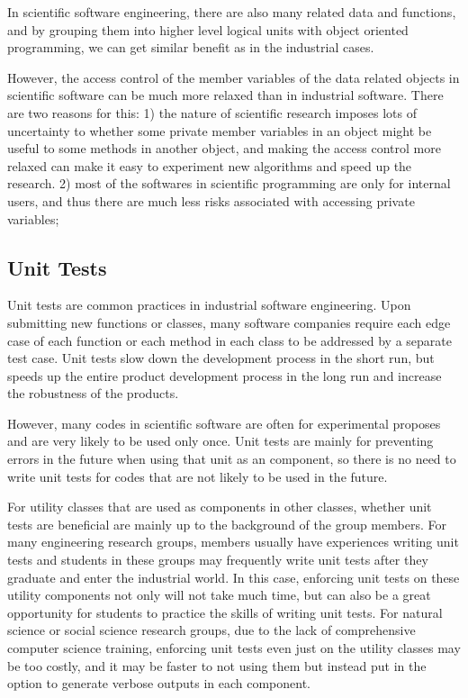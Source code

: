 In scientific software engineering, there are also many related data and functions, and by grouping them into higher level logical units with object oriented programming, we can get similar benefit as in the industrial cases.

However, the access control of the member variables of the data related objects in scientific software can be much more relaxed than in industrial software.
There are two reasons for this:
1) the nature of scientific research imposes lots of uncertainty to whether some private member variables in an object might be useful to some methods in another object, and making the access control more relaxed can make it easy to experiment new algorithms and speed up the research.
2) most of the softwares in scientific programming are only for internal users, and thus there are much less risks associated with accessing private variables;

\subsection{Unit Tests}
Unit tests are common practices in industrial software engineering.
Upon submitting new functions or classes, many software companies require each edge case of each function or each method in each class to be addressed by a separate test case.
Unit tests slow down the development process in the short run, but speeds up the entire product development process in the long run and increase the robustness of the products.

However, many codes in scientific software are often for experimental proposes and are very likely to be used only once.
Unit tests are mainly for preventing errors in the future when using that unit as an component, so there is no need to write unit tests for codes that are not likely to be used in the future.

For utility classes that are used as components in other classes, whether unit tests are beneficial are mainly up to the background of the group members.
For many engineering research groups, members usually have experiences writing unit tests and students in these groups may frequently write unit tests after they graduate and enter the industrial world.
In this case, enforcing unit tests on these utility components not only will not take much time, but can also be a great opportunity for students to practice the skills of writing unit tests.
For natural science or social science research groups, due to the lack of comprehensive computer science training, enforcing unit tests even just on the utility classes may be too costly, and it may be faster to not using them but instead put in the option to generate verbose outputs in each component.

